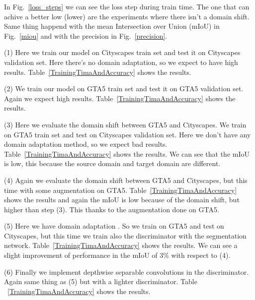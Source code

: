 \documentclass[conference]{IEEEtran}
\begin{document}
In Fig.~\ref{loss_steps} we can see the loss step during train time. The one that can achive a better low (lower) are the experiments
where there isn't a domain shift. Same thing happend with the mean Intersection over Union (mIoU) in Fig.~\ref{miou} and with the
precision in Fig.~\ref{precision}. 

(1) Here we train our model on Cityscapes train set and test it on Cityscapes validation set. Here there's no domain adaptation, so
we expect to have high results. Table~\ref{TrainingTimaAndAccuracy} shows the results.

(2) We train our model on GTA5 train set and test it on GTA5 validation set. Again we expect high results.  
Table~\ref{TrainingTimaAndAccuracy} shows the results.

(3) Here we evaluate the domain shift between GTA5 and Cityscapes. We train on GTA5 train set and test on Cityscapes validation set.
Here we don't have any domain adaptation method, so we expect bad results. Table~\ref{TrainingTimaAndAccuracy} shows the results. We can 
see that the mIoU is low, this because the source domain and target domain are different. 

(4) Again we evaluate the domain shift between GTA5 and Cityscapes, but this time with some augmentation on GTA5. Table~\ref{TrainingTimaAndAccuracy}
shows the results and again the mIoU is low because of the domain shift, but higher than step (3). This thanks to the augmentation
done on GTA5.

(5) Here we have domain adaptation \cite{b3}. So we train on GTA5 and test on Cityscapes, but this time we train also the discriminator
with the segmentation network. Table~\ref{TrainingTimaAndAccuracy} shows the results. We can see a slight improvement of performance
in the mIoU of 3\% with respect to (4).

(6) Finally we implement depthwise separable convolutions in the discriminator. Again same thing as (5) but with a lighter discriminator. Table
~\ref{TrainingTimaAndAccuracy} shows the results. 
\end{document}
